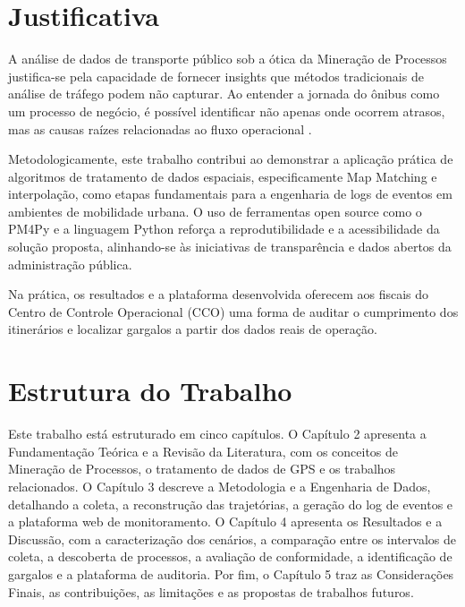 \section{Justificativa}\label{sec:justificativa}

A análise de dados de transporte público sob a ótica da Mineração de Processos justifica-se pela capacidade de fornecer insights que métodos tradicionais de análise de tráfego podem não capturar. Ao entender a jornada do ônibus como um processo de negócio, é possível identificar não apenas onde ocorrem atrasos, mas as causas raízes relacionadas ao fluxo operacional \cite{aalst2016}.

Metodologicamente, este trabalho contribui ao demonstrar a aplicação prática de algoritmos de tratamento de dados espaciais, especificamente Map Matching e interpolação, como etapas fundamentais para a engenharia de logs de eventos em ambientes de mobilidade urbana. O uso de ferramentas open source como o PM4Py e a linguagem Python \cite{berti2019} reforça a reprodutibilidade e a acessibilidade da solução proposta, alinhando-se às iniciativas de transparência e dados abertos da administração pública.

Na prática, os resultados e a plataforma desenvolvida oferecem aos fiscais do Centro de Controle Operacional (CCO) uma forma de auditar o cumprimento dos itinerários e localizar gargalos a partir dos dados reais de operação.

\section{Estrutura do Trabalho}\label{sec:estrutura}

Este trabalho está estruturado em cinco capítulos. O Capítulo 2 apresenta a Fundamentação Teórica e a Revisão da Literatura, com os conceitos de Mineração de Processos, o tratamento de dados de GPS e os trabalhos relacionados. O Capítulo 3 descreve a Metodologia e a Engenharia de Dados, detalhando a coleta, a reconstrução das trajetórias, a geração do log de eventos e a plataforma web de monitoramento. O Capítulo 4 apresenta os Resultados e a Discussão, com a caracterização dos cenários, a comparação entre os intervalos de coleta, a descoberta de processos, a avaliação de conformidade, a identificação de gargalos e a plataforma de auditoria. Por fim, o Capítulo 5 traz as Considerações Finais, as contribuições, as limitações e as propostas de trabalhos futuros.
